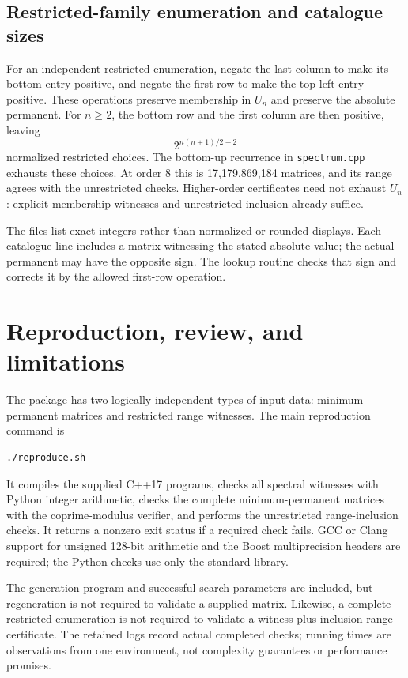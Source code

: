 \documentclass[11pt,a4paper]{article}
\theoremstyle{remark}\newtheorem{remark}[theorem]{Remark}
\newcommand{\Om}{\Omega}
\begin{document}
\subsection{Restricted-family enumeration and catalogue sizes}
For an independent restricted enumeration, negate the last column to make its bottom entry positive, and negate the first row to make the top-left entry positive. These operations preserve membership in $U_n$ and preserve the absolute permanent. For $n\geq2$, the bottom row and the first column are then positive, leaving
\[
 2^{n(n+1)/2-2}
\]
normalized restricted choices. The bottom-up recurrence in \texttt{spectrum.cpp} exhausts these choices. At order 8 this is 17,179,869,184 matrices, and its range agrees with the unrestricted checks. Higher-order certificates need not exhaust $U_n$: explicit membership witnesses and unrestricted inclusion already suffice.

\begin{table}[htbp]
\centering\small

\caption{Certified common ranges of $\Om_n$ and $U_n$. Zero, when present, is counted once in each column.}
\label{tab:ranges}
\end{table}

The files list exact integers rather than normalized or rounded displays. Each catalogue line includes a matrix witnessing the stated absolute value; the actual permanent may have the opposite sign. The lookup routine checks that sign and corrects it by the allowed first-row operation.

\section{Reproduction, review, and limitations}
The package has two logically independent types of input data: minimum-permanent matrices and restricted range witnesses. The main reproduction command is
\begin{Verbatim}[fontsize=\small]
./reproduce.sh
\end{Verbatim}
It compiles the supplied C++17 programs, checks all spectral witnesses with Python integer arithmetic, checks the complete minimum-permanent matrices with the coprime-modulus verifier, and performs the unrestricted range-inclusion checks. It returns a nonzero exit status if a required check fails. GCC or Clang support for unsigned 128-bit arithmetic and the Boost multiprecision headers are required; the Python checks use only the standard library.

The generation program and successful search parameters are included, but regeneration is not required to validate a supplied matrix. Likewise, a complete restricted enumeration is not required to validate a witness-plus-inclusion range certificate. The retained logs record actual completed checks; running times are observations from one environment, not complexity guarantees or performance promises.
\end{document}

